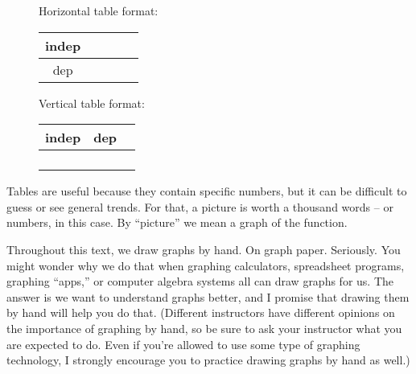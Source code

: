  \begin{center}
 \begin{figure} [h]
\begin{minipage}{3.5in} 
Horizontal table format:

\bigskip

\begin{tabular} {|c| |c|c|c|c|} \hline
indep & \hspace{.5in} & \hspace{.5in} & \hspace{.5in} &\hspace{.5in}  \\ \hline
dep & & & & \\ \hline
\end{tabular}
\vspace{.6in}  %
\end{minipage} 
\begin{minipage}{2.5 in} 
Vertical table format:

\bigskip

\begin{tabular} {|c| c|} \hline
\hspace{.05in}  indep \hspace{.05in} & \hspace{.1in} dep\hspace{.1in} ~  \\ \hline \hline
&  \\ \hline
& \\ \hline
& \\ \hline
& \\ \hline
\end{tabular}
\end{minipage} 
\end{figure}
\end{center}
\vspace{-.5in}  %
 
Tables are useful because they contain specific numbers, but it can be difficult to guess or see general trends.  For that, a picture is worth a thousand words -- or numbers, in this case.   By ``picture'' we mean a graph of the function.  

Throughout this text, we draw graphs by hand.  On graph paper.  Seriously.  You might wonder why we do that  when graphing calculators, spreadsheet programs, graphing ``apps,'' or computer algebra systems all can draw graphs for us.  The answer is we want to understand graphs better, and I promise that drawing them by hand will help you do that.  (Different instructors have different opinions on the importance of graphing by hand, so be sure to ask your instructor what you are expected to do.  Even if you're allowed to use some type of graphing technology, I strongly encourage you to practice drawing graphs by hand as well.)

